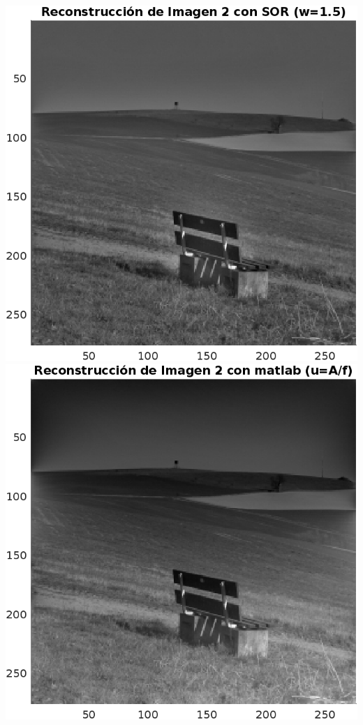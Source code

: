 \begin{homeworkProblem}
\begin{solucion}
\begin{center}
      \includegraphics[scale=0.6]{Figures/Figure_2SOR.png}
      \includegraphics[scale=0.6]{Figures/Figure_2matlab.png}
    \end{center}

\end{solucion}
\end{homeworkProblem}
